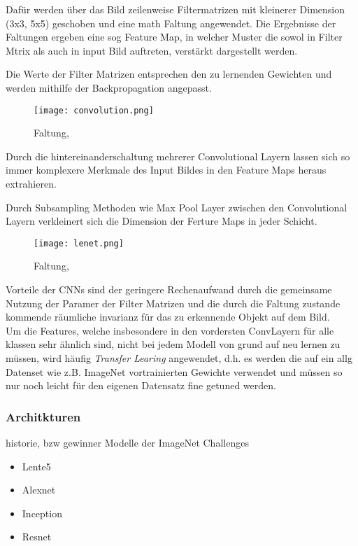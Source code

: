 Dafür werden über das Bild zeilenweise Filtermatrizen mit kleinerer Dimension
(3x3, 5x5) geschoben und eine math Faltung angewendet.
Die Ergebnisse der Faltungen ergeben eine sog Feature Map, in welcher 
Muster die sowol in Filter Mtrix als auch in input Bild auftreten, verstärkt 
dargestellt werden.

Die Werte der Filter Matrizen entsprechen den zu lernenden Gewichten 
und werden mithilfe der Backpropagation angepasst.

\begin{figure}[htb]
    \centering
    \label{fig:conv}
    \texttt{[image: convolution.png]}
    \caption{Faltung, \cite{researcherSimpleIntroductionConvolutional2019}}
\end{figure}



Durch die hintereinanderschaltung mehrerer Convolutional Layern 
lassen sich so immer komplexere Merkmale des Input Bildes in den 
Feature Maps heraus extrahieren.

Durch Subsampling Methoden wie Max Pool Layer zwischen den Convolutional
Layern verkleinert sich die Dimension der Ferture Maps in jeder Schicht.


\begin{figure}[htb]
    \centering
    \label{fig:conv}
    \texttt{[image: lenet.png]}
    \caption{Faltung, \cite{lecunGradientBasedLearningApplied1998}}
\end{figure}


Vorteile der CNNs sind der geringere Rechenaufwand durch die gemeinsame 
Nutzung der Paramer der Filter Matrizen und die durch die 
Faltung zustande kommende räumliche invarianz für das zu erkennende 
Objekt auf dem Bild.
\\
Um die Features, welche insbesondere in den vordersten ConvLayern für 
alle klassen sehr ähnlich sind, nicht bei jedem Modell von grund auf 
neu lernen zu müssen, wird häufig \textit{Transfer Learing} angewendet, 
d.h. es werden die auf ein allg Datenset wie z.B. ImageNet vortrainierten
Gewichte verwendet und müssen so nur noch leicht für den eigenen Datensatz 
fine getuned werden.


\subsubsection{Architkturen}
historie, bzw gewinner Modelle der ImageNet Challenges

\begin{itemize}
    \item Lente5
    \item Alexnet
    \item Inception
    \item Resnet
\end{itemize}


